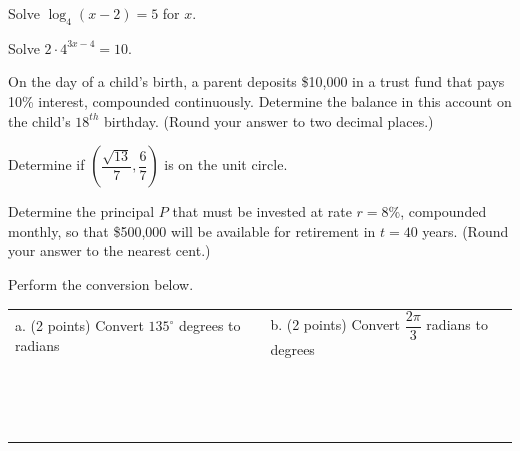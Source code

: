 \documentclass[addpoints]{exam}
\begin{document}
\begin{questions}


\question[3]
Solve $\log_4(x-2)=5$ for $x$.

\vfill

\noindent\makebox[\linewidth]{\rule{\paperwidth}{0.4pt}}
\question[5]
Solve $2\cdot 4^{3x-4} =10$.

\vfill


\question[3] On the day of a child's birth, a parent deposits \$10,000 in a trust fund that pays 10\% interest, compounded continuously. Determine the balance in this account on the child's $18^{th}$ birthday. (Round your answer to two decimal places.)


\vfill
\pagebreak

\question[5]
Determine if $\left(\dfrac{\sqrt{13}}{7},\dfrac{6}{7}\right)$ is on the unit circle.

\vfill



\question[5]
Determine the principal $P$ that must be invested at rate $r = 8\%$, compounded monthly, so that \$500,000 will be available for retirement in $t = 40$ years. (Round your answer to the nearest cent.)

\vfill


\question
Perform the conversion below.\\
\begin{tabular}{l|l}

a. (2 points) Convert $135^{\circ}$ degrees to radians & b. (2 points) Convert $\dfrac{2\pi}{3}$ radians to degrees\\
&\\
&\\
&\\
&\\
&\\
&\\
&\\
&\\
&\\
&\\
&\\
&\\
&\\
&\\
&\\
\end{tabular}


\end{questions}
\end{document}
